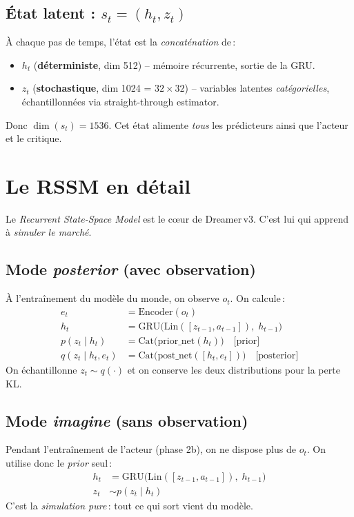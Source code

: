 \documentclass[11pt,a4paper]{article}
\newcommand{\dreamer}{Dreamer\,v3}
\newcommand{\rssm}{RSSM}
\newcommand{\bluebf}[1]{\textbf{\color{enseirbblue}#1}}
\begin{document}
\subsection{État latent : \(s_t = (h_t, z_t)\)}
À chaque pas de temps, l'état est la \emph{concaténation} de\,:
\begin{itemize}
    \item \(h_t\) (\bluebf{déterministe}, dim 512) -- mémoire récurrente,
          sortie de la GRU.
    \item \(z_t\) (\bluebf{stochastique}, dim 1024 = $32\times32$) --
          variables latentes \emph{catégorielles}, échantillonnées via
          straight-through estimator.
\end{itemize}
Donc \(\dim(s_t)=1536\). Cet état alimente \emph{tous} les prédicteurs
ainsi que l'acteur et le critique.

\section{Le \rssm{} en détail}

Le \emph{Recurrent State-Space Model} est le cœur de \dreamer. C'est lui
qui apprend à \emph{simuler le marché}.

\subsection{Mode \emph{posterior} (avec observation)}
À l'entraînement du modèle du monde, on observe \(o_t\). On calcule\,:
\begin{align}
    e_t       &= \text{Encoder}(o_t) \\
    h_t       &= \text{GRU}\bigl(\text{Lin}([z_{t-1}, a_{t-1}]),\;h_{t-1}\bigr) \\
    p(z_t\mid h_t)        &= \text{Cat}\bigl(\text{prior\_net}(h_t)\bigr) \quad\text{[prior]} \\
    q(z_t\mid h_t, e_t)   &= \text{Cat}\bigl(\text{post\_net}([h_t, e_t])\bigr) \quad\text{[posterior]}
\end{align}
On échantillonne \(z_t \sim q(\cdot)\) et on conserve les deux distributions
pour la perte KL.

\subsection{Mode \emph{imagine} (sans observation)}
Pendant l'entraînement de l'acteur (phase 2b), on ne dispose plus de
\(o_t\). On utilise donc le \emph{prior} seul\,:
\begin{align}
    h_t       &= \text{GRU}\bigl(\text{Lin}([z_{t-1}, a_{t-1}]),\;h_{t-1}\bigr) \\
    z_t       &\sim p(z_t\mid h_t)
\end{align}
C'est la \emph{simulation pure}\,: tout ce qui sort vient du modèle.
\end{document}
